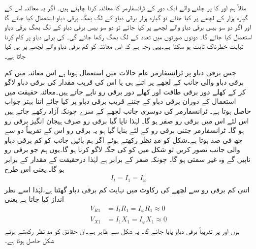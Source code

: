 	مثلاً  ہم   اور   کا  پر چلنے والے ایک دور کے ٹرانسفارمر کا معائنہ کرنا چاہتے ہیں۔ اگر یہ معائنہ اس کے گیارہ ہزار کے لچھے پر  کیا جائے تو گیارہ ہزار برقی دباو کے لگ بھگ برقی دباو استعمال کیا جائے گا اور اگر دو سو بیس برقی دباو والے لچھے پر کیا جائے تو دو سو بیس برقی دباو کے لگ بھگ برقی دباو  استعمال کیا جائے گا۔ دونوں صورتوں میں تعدد  کے لگ بھگ رکھا جائے گی۔ کی برقی دباو پر کام کرنا نہایت خطرناک ثابت ہو سکتا ہے۔یہی وجہ ہے کہ اس معائنہ کو کم برقی دباو والے لچھے پر ہی کیا جاتا ہے۔

 جس برقی دباو پر ٹرانسفارمر عام حالات میں استعمال ہوتا ہے اس معائنہ میں کم برقی دباو والی جانب کے لچھے پر اتنے ہی یا اس کی قریب مقدار کی برقی دباو  لاگو کر کے کھلے دور برقی طاقت  اور  کھلے دور برقی رو   ناپے جاتے ہیں۔معائنہ حقیقت میں استعمال کے دوران برقی دباو کے جتنے قریب برقی دباو پر کیا جائے اتنا بہتر جواب حاصل ہوتا ہے۔ ٹرانسفارمر کی دوسری جانب لچھے کے سرے چونکہ آزاد رکھے جاتے ہیں اس لئے اس میں  برقی رو صفر ہو گا۔  لہٰذا ناپا گیا برقی رو صرف ہیجان انگیز برقی رو  ہو گا۔ ٹرانسفارمر جتنی برقی رو کے لئے بنایا گیا ہو یہ برقی رو اس  کے تقریباً دو سے چھ  فی صد ہوتا ہے۔شکل    کو مدِ نظر رکھتے ہوئے اگر ہم بائیں جانب کو کم برقی دباو والی جانب تصور کریں تو شکل میں  کو   کی جگہ لاگو کرنا ہو گا۔یوں ہم جو برقی رو ناپیں گے وہ  غیر سمتی   ہو گا۔ چونکہ   صفر کے برابر ہے لہٰذا   درحقیقت  کے مقدار  کے برابر ہو گا۔ یعنی  اس  طرح
\begin{align*}
I_t=I_1=I_\varphi
\end{align*}
اتنی کم برقی رو سے لچھے کی رکاوٹ میں نہایت کم برقی دباو گھٹتا ہے،لہٰذا اسے نظر انداز کیا جاتا ہے یعنی
\begin{align*}
V_{R1}&=I_t R_1=I_\varphi R_1 \approx 0\\
V_{X1}&=I_1 X_1=I_\varphi X_1 \approx 0
\end{align*}
یوں    اور  پر  تقریباً  برقی دباو پایا جائے گا۔ یہ شکل   سے ظاہر ہے۔ان حقائق کو مد نظر رکھتے ہوئے شکل  حاصل ہوتا ہے۔
